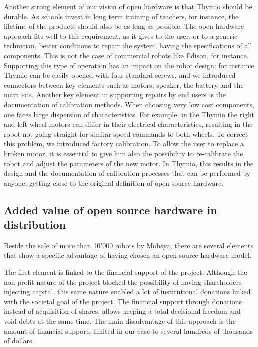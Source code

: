 \documentclass[letterpaper, 10 pt, conference]{ieeeconf}  %
\begin{document}
Another strong element of our vision of open hardware is that Thymio should be durable.
As schools invest in long term training of teachers, for instance, the lifetime of the products should also be as long as possible. 
The open hardware approach fits well to this requirement, as it gives to the user, or to a generic technician, better conditions to repair the system, having the specifications of all components. This is not the case of commercial robots like Edison, for instance.
Supporting this type of operation has an impact on the robot design; for instance Thymio can be easily opened with four standard screws, and we introduced connectors between key elements such as motors, speaker, the battery and the main \textsc{pcb}.
Another key element in supporting repairs by end users is the documentation of calibration methods. 
When choosing very low cost components, one faces large dispersion of characteristics. 
For example, in the Thymio the right and left wheel motors can differ in their electrical characteristics, resulting in the robot not going straight for similar speed commands to both wheels.
To correct this problem, we introduced factory calibration. %
To allow the user to replace a broken motor, it is essential to give him also the possibility to re-calibrate the robot and adjust the parameters of the new motor.
In Thymio, this results in the design and the documentation of calibration processes that can be performed by anyone, getting close to the original definition of open source hardware.

\iffalse
\subsection{Added value of open source hardware in distribution}

Beside the sale of more than 10'000 robots by Mobsya, there are several elements that show a specific advantage of having chosen an open source hardware model.

The first element is linked to the financial support of the project.
Although the non-profit nature of the project blocked the possibility of having shareholders injecting capital, this same nature enabled a lot of institutional donations linked with the societal goal of the project.
The financial support through donations instead of acquisition of shares, allows keeping a total decisional freedom and void debts at the same time.
The main disadvantage of this approach is the amount of financial support, limited in our case to several hundreds of thousands of dollars. 
\end{document}
